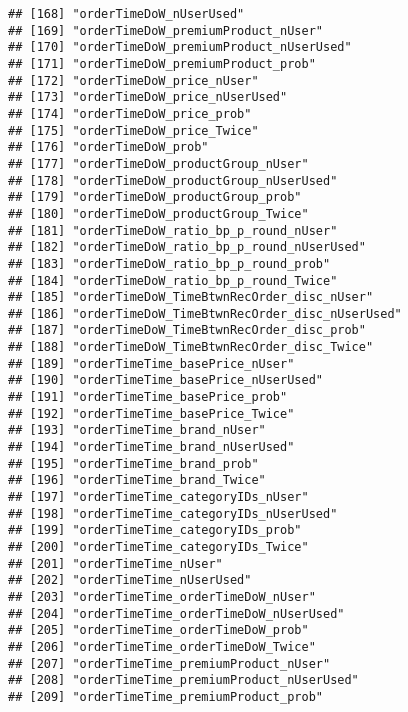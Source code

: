 \documentclass[10pt]{report}
\begin{document}
\begin{verbatim}
## [168] "orderTimeDoW_nUserUsed"                             
## [169] "orderTimeDoW_premiumProduct_nUser"                  
## [170] "orderTimeDoW_premiumProduct_nUserUsed"              
## [171] "orderTimeDoW_premiumProduct_prob"                   
## [172] "orderTimeDoW_price_nUser"                           
## [173] "orderTimeDoW_price_nUserUsed"                       
## [174] "orderTimeDoW_price_prob"                            
## [175] "orderTimeDoW_price_Twice"                           
## [176] "orderTimeDoW_prob"                                  
## [177] "orderTimeDoW_productGroup_nUser"                    
## [178] "orderTimeDoW_productGroup_nUserUsed"                
## [179] "orderTimeDoW_productGroup_prob"                     
## [180] "orderTimeDoW_productGroup_Twice"                    
## [181] "orderTimeDoW_ratio_bp_p_round_nUser"                
## [182] "orderTimeDoW_ratio_bp_p_round_nUserUsed"            
## [183] "orderTimeDoW_ratio_bp_p_round_prob"                 
## [184] "orderTimeDoW_ratio_bp_p_round_Twice"                
## [185] "orderTimeDoW_TimeBtwnRecOrder_disc_nUser"           
## [186] "orderTimeDoW_TimeBtwnRecOrder_disc_nUserUsed"       
## [187] "orderTimeDoW_TimeBtwnRecOrder_disc_prob"            
## [188] "orderTimeDoW_TimeBtwnRecOrder_disc_Twice"           
## [189] "orderTimeTime_basePrice_nUser"                      
## [190] "orderTimeTime_basePrice_nUserUsed"                  
## [191] "orderTimeTime_basePrice_prob"                       
## [192] "orderTimeTime_basePrice_Twice"                      
## [193] "orderTimeTime_brand_nUser"                          
## [194] "orderTimeTime_brand_nUserUsed"                      
## [195] "orderTimeTime_brand_prob"                           
## [196] "orderTimeTime_brand_Twice"                          
## [197] "orderTimeTime_categoryIDs_nUser"                    
## [198] "orderTimeTime_categoryIDs_nUserUsed"                
## [199] "orderTimeTime_categoryIDs_prob"                     
## [200] "orderTimeTime_categoryIDs_Twice"                    
## [201] "orderTimeTime_nUser"                                
## [202] "orderTimeTime_nUserUsed"                            
## [203] "orderTimeTime_orderTimeDoW_nUser"                   
## [204] "orderTimeTime_orderTimeDoW_nUserUsed"               
## [205] "orderTimeTime_orderTimeDoW_prob"                    
## [206] "orderTimeTime_orderTimeDoW_Twice"                   
## [207] "orderTimeTime_premiumProduct_nUser"                 
## [208] "orderTimeTime_premiumProduct_nUserUsed"             
## [209] "orderTimeTime_premiumProduct_prob"                  

\end{verbatim}
\end{document}
